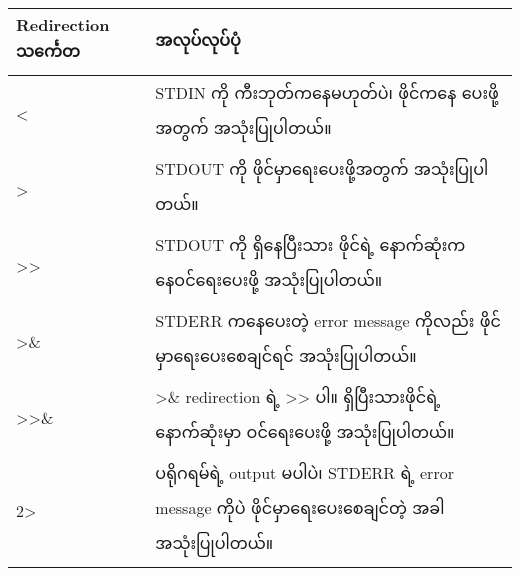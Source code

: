 \documentclass[11pt]{article}
\begin{document}
\begin{longtable}[c]{@{}ll@{}}
\toprule
\begin{minipage}[b]{0.21\columnwidth}\raggedright\strut
Redirection သင်္ကေတ
\strut\end{minipage} &
\begin{minipage}[b]{0.73\columnwidth}\raggedright\strut
အလုပ်လုပ်ပုံ
\strut\end{minipage}\tabularnewline
\midrule
\endhead
\begin{minipage}[t]{0.21\columnwidth}\raggedright\strut
\textless{}
\strut\end{minipage} &
\begin{minipage}[t]{0.73\columnwidth}\raggedright\strut
STDIN ကို ကီးဘုတ်ကနေမဟုတ်ပဲ၊ ဖိုင်ကနေ ပေးဖို့အတွက် အသုံးပြုပါတယ်။
\strut\end{minipage}\tabularnewline
\begin{minipage}[t]{0.21\columnwidth}\raggedright\strut
\textgreater{}
\strut\end{minipage} &
\begin{minipage}[t]{0.73\columnwidth}\raggedright\strut
STDOUT ကို ဖိုင်မှာရေးပေးဖို့အတွက် အသုံးပြုပါတယ်။
\strut\end{minipage}\tabularnewline
\begin{minipage}[t]{0.21\columnwidth}\raggedright\strut
\textgreater{}\textgreater{}
\strut\end{minipage} &
\begin{minipage}[t]{0.73\columnwidth}\raggedright\strut
STDOUT ကို ရှိနေပြီးသား ဖိုင်ရဲ့ နောက်ဆုံးကနေဝင်ရေးပေးဖို့
အသုံးပြုပါတယ်။
\strut\end{minipage}\tabularnewline
\begin{minipage}[t]{0.21\columnwidth}\raggedright\strut
\textgreater{}\&
\strut\end{minipage} &
\begin{minipage}[t]{0.73\columnwidth}\raggedright\strut
STDERR ကနေပေးတဲ့ error message ကိုလည်း ဖိုင်မှာရေးပေးစေချင်ရင်
အသုံးပြုပါတယ်။
\strut\end{minipage}\tabularnewline
\begin{minipage}[t]{0.21\columnwidth}\raggedright\strut
\textgreater{}\textgreater{}\&
\strut\end{minipage} &
\begin{minipage}[t]{0.73\columnwidth}\raggedright\strut
\textgreater{}\& redirection ရဲ့ \textgreater{}\textgreater{} ပါ။
ရှိပြီးသားဖိုင်ရဲ့ နောက်ဆုံးမှာ ဝင်ရေးပေးဖို့ အသုံးပြုပါတယ်။
\strut\end{minipage}\tabularnewline
\begin{minipage}[t]{0.21\columnwidth}\raggedright\strut
2\textgreater{}
\strut\end{minipage} &
\begin{minipage}[t]{0.73\columnwidth}\raggedright\strut
ပရိုဂရမ်ရဲ့ output မပါပဲ၊ STDERR ရဲ့ error message ကိုပဲ
ဖိုင်မှာရေးပေးစေချင်တဲ့ အခါ အသုံးပြုပါတယ်။
\strut\end{minipage}\tabularnewline
\bottomrule
\end{longtable}
\end{document}
